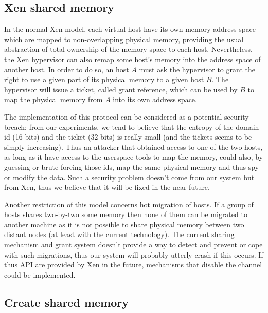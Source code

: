 \documentclass[journal]{IEEEtran}
\begin{document}
\subsection{Xen shared memory}

In the normal Xen model, each virtual host have its own memory address space which are mapped to non-overlapping physical memory, providing the usual abstraction of total ownership of the memory space to each host. Nevertheless, the Xen hypervisor can also remap some host's memory into the address space of another host. In order to do so, an host $A$ must ask the hypervisor to grant the right to use a given part of its physical memory to a given host $B$. The hypervisor will issue a ticket, called grant reference, which can be used by $B$ to map the physical memory from $A$ into its own address space.

The implementation of this protocol can be considered as a potential security breach: from our experiments, we tend to believe that the entropy of the domain id (16 bits) and the ticket (32 bits) is really small (and the tickets seems to be simply increasing). Thus an attacker that obtained access to one of the two hosts, as long as it have access to the userspace tools to map the memory, could also, by guessing or brute-forcing those ids, map the same physical memory and thus spy or modify the data. Such a security problem doesn't come from our system but from Xen, thus we believe that it will be fixed in the near future.

Another restriction of this model concerns hot migration of hosts. If a group of hosts shares two-by-two some memory then none of them can be migrated to another machine as it is not possible to share physical memory between two distant nodes (at least with the current technology). The current sharing mechanism and grant system doesn't provide a way to detect and prevent or cope with such migrations, thus our system will probably utterly crash if this occurs. If thus API are provided by Xen in the future, mechanisms that disable the channel could be implemented.

\subsection{Create shared memory}
\end{document}
